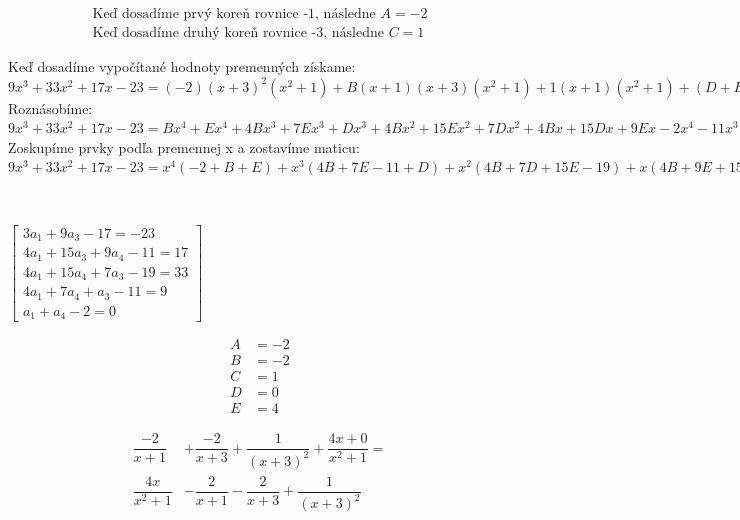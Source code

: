 \documentclass[a4paper]{article}
\begin{document}
	\begin{align*}
	\text{Keď dosadíme prvý koreň rovnice -1, následne } A = -2\\
	\text{Keď dosadíme druhý koreň rovnice -3, následne } C = 1
	\end{align*}
	

	Keď dosadíme vypočítané hodnoty premenných získame: 
	\\
	
	$9x^3 + 33x^2 + 17x - 23 = (-2)(x+3)^2(x^2 + 1) + B(x+1)(x+3)(x^2+1) +
	1(x+1)(x^2+1) + (D + Ex)(x+1)(x+3)^2$
	\\
	
	Roznásobíme:
	\\
	
	$9x^3 + 33x^2 + 17x - 23 = Bx^4 + Ex^4 + 4Bx^3 + 7Ex^3 + Dx^3 + 4Bx^2 +
	15Ex^2 + 7Dx^2 + 4Bx + 15Dx + 9Ex - 2x^4 - 11x^3 - 19x^2 - 11x + 3B + 9D - 17$
	\\
	
	Zoskupíme prvky podľa premennej x a zostavíme maticu:
	\\
	
	$9x^3 + 33x^2 + 17x - 23 = x^4(-2 + B + E) + x^3(4B + 7E - 11 + D) + 
	x^2(4B + 7D + 15E - 19) + x(4B + 9E + 15D - 11) + (3B + 9D - 17)$
	
	\\
	\begin{center}$
	\begin{bmatrix}
		3a_1+9a_3-17=-23\\
		4a_1+15a_3+9a_4-11=17\\
		4a_1+15a_4+7a_3-19=33\\
		4a_1+7a_4+a_3-11=9\\
		a_1+a_4-2=0
	\end{bmatrix}$
	\end{center}
	\begin{align*}
	A&=-2\\
	B&=-2\\
	C&=1\\
	D&=0\\
	E&=4
	\end{align*}
	
	\begin{align*}
	\dfrac{-2}{x+1} & + \dfrac{-2}{x+3} + \dfrac{1}{(x+3)^2} + \dfrac{4x+0}{x^2+1} =\\
	\dfrac{4x}{x^2+1} & - \dfrac{2}{x+1} - \dfrac{2}{x+3} + \dfrac{1}{(x+3)^2}
	\end{align*}
	
	\newpage
	
\end{document}
